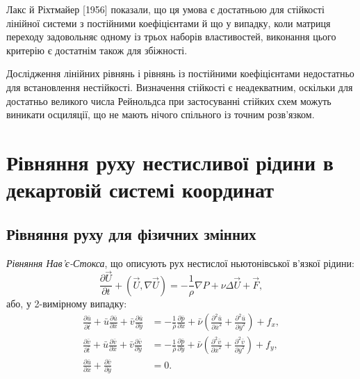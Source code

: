Лакс й Ріхтмайер [1956] показали, що ця умова є достатньою для стійкості лінійної системи з постійними коефіцієнтами й що у випадку, коли матриця переходу задовольняє одному із трьох наборів властивостей, виконання цього критерію є достатнім також для збіжності.

\begin{remark}
    Дослідження лінійних рівнянь і рівнянь із постійними коефіцієнтами недостатньо для встановлення нестійкості. Визначення стійкості є неадекватним, оскільки для достатньо великого числа Рейнольдса при застосуванні стійких схем можуть виникати осциляції, що не мають нічого спільного із точним розв'язком.
\end{remark}
\newpage
\section{Рівняння руху нестисливої рідини в декартовій системі координат}

\subsection{Рівняння руху для фізичних змінних}

\begin{definition}
    \textit{Рівняння Нав'є-Стокса}, що описують рух нестислої ньютонівської в'язкої рідини:
    \begin{equation}
        \frac{\partial \vec U}{\partial t} + \left(\vec U, \nabla \vec U\right) = - \frac{1}{\rho} \nabla P + \nu \Delta \vec U + \vec F,
    \end{equation}
    або, у 2-вимірному випадку:
    \begin{align}
        \label{eq:2.1}
        \frac{\partial \bar u}{\partial \bar t} + \bar u \frac{\partial \bar u}{\partial \bar x} + \bar v \frac{\partial \bar u}{\partial \bar y} &= - \frac{1}{\bar \rho} \frac{\partial \bar p}{\partial \bar x} + \bar \nu \left( \frac{\partial^2 \bar u}{\partial \bar x^2} + \frac{\partial^2 \bar u}{\partial \bar y^2} \right) + f_x, \\
        \label{eq:2.2}
        \frac{\partial \bar v}{\partial \bar t} + \bar u \frac{\partial \bar v}{\partial \bar x} + \bar v \frac{\partial \bar v}{\partial \bar y} &= - \frac{1}{\bar \rho} \frac{\partial \bar p}{\partial \bar y} + \bar \nu \left( \frac{\partial^2 \bar v}{\partial \bar x^2} + \frac{\partial^2 \bar v}{\partial \bar y^2} \right) + f_y, \\
        \label{eq:2.3}
        \frac{\partial \bar u}{\partial \bar x} + \frac{\partial \bar v}{\partial \bar y} &= 0.
    \end{align}
\end{definition}

